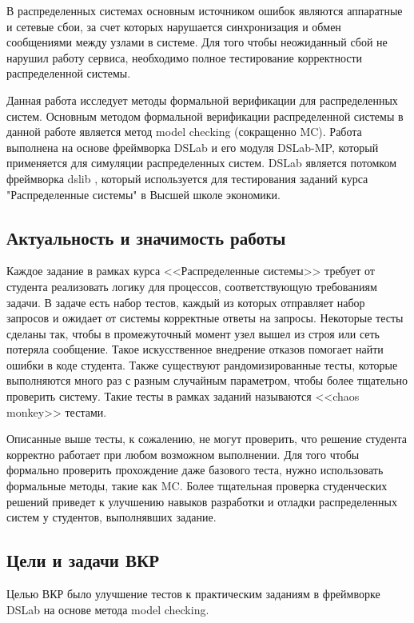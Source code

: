 \documentclass[a4paper,12pt]{extarticle}
\newcommand{\mc}[0]{MC}
\begin{document}
В распределенных системах основным источником ошибок являются аппаратные и сетевые сбои, за счет которых нарушается синхронизация и обмен сообщениями между узлами в системе.
Для того чтобы неожиданный сбой не нарушил работу сервиса, необходимо полное тестирование корректности распределенной системы.

Данная работа исследует методы формальной верификации для распределенных систем.
Основным методом формальной верификации распределенной системы в данной работе является метод model checking (сокращенно \mc).
Работа выполнена на основе фреймворка DSLab \cite{b12} и его модуля DSLab-MP, который применяется для симуляции распределенных систем.
DSLab является потомком фреймворка dslib \cite{b11}, который используется для тестирования заданий курса "Распределенные системы" в Высшей школе экономики.

\subsection{Актуальность и значимость работы}


Каждое задание в рамках курса <<Распределенные системы>> требует от студента реализовать логику для процессов, соответствующую требованиям задачи.
В задаче есть набор тестов, каждый из которых отправляет набор запросов и ожидает от системы корректные ответы на запросы.
Некоторые тесты сделаны так, чтобы в промежуточный момент узел вышел из строя или сеть потеряла сообщение.
Такое искусственное внедрение отказов помогает найти ошибки в коде студента.
Также существуют рандомизированные тесты, которые выполняются много раз с разным случайным параметром, чтобы более тщательно проверить систему.
Такие тесты в рамках заданий называются <<chaos monkey>> тестами.

Описанные выше тесты, к сожалению, не могут проверить, что решение студента корректно работает при любом возможном выполнении.
Для того чтобы формально проверить прохождение даже базового теста, нужно использовать формальные методы, такие как \mc.
Более тщательная проверка студенческих решений приведет к улучшению навыков разработки и отладки распределенных систем у студентов, выполнявших задание.

\subsection{Цели и задачи ВКР}

Целью ВКР было улучшение тестов к практическим заданиям в фреймворке DSLab на основе метода model checking.
\end{document}
